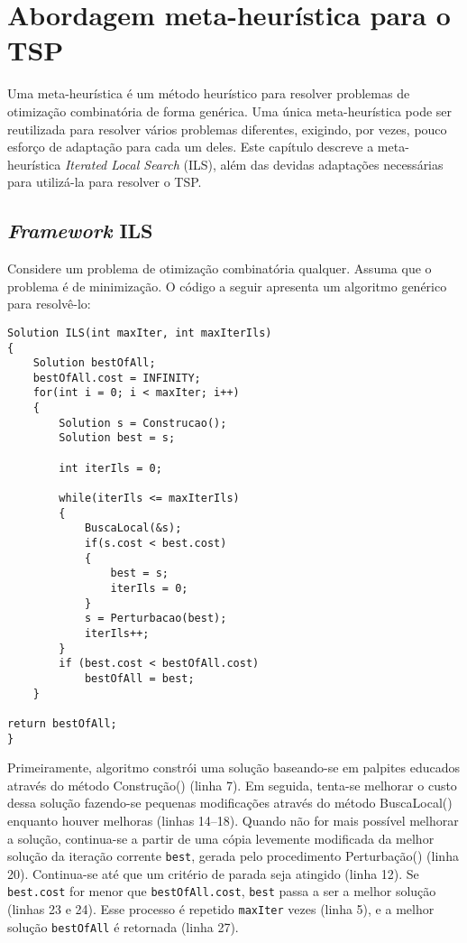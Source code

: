 \chapter{Abordagem meta-heurística para o TSP}
\thispagestyle{empty}

Uma meta-heurística é um método heurístico para resolver problemas de otimização combinatória de forma genérica. Uma única meta-heurística pode ser reutilizada para resolver vários problemas diferentes, exigindo, por vezes, pouco esforço de adaptação para cada um deles. Este capítulo descreve a meta-heurística \textit{Iterated Local Search} (ILS), além das devidas adaptações necessárias para utilizá-la para resolver o TSP.

\section{\textit{Framework} ILS}
Considere um problema de otimização combinatória qualquer. Assuma que o problema é de minimização. O código a seguir apresenta um algoritmo genérico para resolvê-lo: 

\begin{lstlisting}[style=cplusplusListStyle]
Solution ILS(int maxIter, int maxIterIls)
{
	Solution bestOfAll;
	bestOfAll.cost = INFINITY;
	for(int i = 0; i < maxIter; i++)
	{
		Solution s = Construcao();
		Solution best = s;
	
		int iterIls = 0;
	
		while(iterIls <= maxIterIls)
		{
			BuscaLocal(&s);
			if(s.cost < best.cost)
			{
				best = s;
				iterIls = 0;		
			}
			s = Perturbacao(best);
			iterIls++;
		}
		if (best.cost < bestOfAll.cost)
			bestOfAll = best;	
	}

return bestOfAll;
}
\end{lstlisting}

Primeiramente, algoritmo constrói uma solução baseando-se em palpites educados através do método Construção() (linha 7). Em seguida, tenta-se melhorar o custo dessa solução fazendo-se pequenas modificações através do método BuscaLocal() enquanto houver melhoras (linhas 14--18). Quando não for mais possível melhorar a solução, continua-se a partir de uma cópia levemente modificada da melhor solução da iteração corrente \texttt{best}, gerada pelo procedimento Perturbação() (linha 20). Continua-se até que um critério de parada seja atingido (linha 12). Se \texttt{best.cost} for menor que \texttt{bestOfAll.cost}, \texttt{best} passa a ser a melhor solução (linhas 23 e 24). Esse processo é repetido \texttt{maxIter} vezes (linha 5), e a melhor solução \texttt{bestOfAll} é retornada (linha 27).

